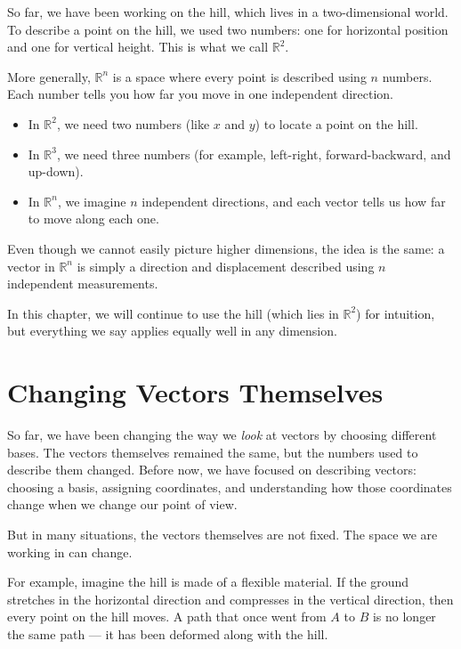 \documentclass[11pt,openany]{book}
\theoremstyle{definition}
\begin{document}
So far, we have been working on the hill, which lives in a two-dimensional world. 
To describe a point on the hill, we used two numbers: one for horizontal position 
and one for vertical height. This is what we call $\mathbb{R}^2$.

\medskip

More generally, $\mathbb{R}^n$ is a space where every point is described using $n$ 
numbers. Each number tells you how far you move in one independent direction.

\medskip

\begin{itemize}
  \item In $\mathbb{R}^2$, we need two numbers (like $x$ and $y$) to locate a point on the hill.
  \item In $\mathbb{R}^3$, we need three numbers (for example, left-right, forward-backward, and up-down).
  \item In $\mathbb{R}^n$, we imagine $n$ independent directions, and each vector tells us how far to move along each one.
\end{itemize}

\medskip

Even though we cannot easily picture higher dimensions, the idea is the same: 
a vector in $\mathbb{R}^n$ is simply a direction and displacement described using $n$ independent measurements.

\medskip

In this chapter, we will continue to use the hill (which lies in $\mathbb{R}^2$) 
for intuition, but everything we say applies equally well in any dimension.

\section{Changing Vectors Themselves}

So far, we have been changing the way we \textit{look} at vectors by choosing different bases. 
The vectors themselves remained the same, but the numbers used to describe them changed.
Before now, we have focused on describing vectors: choosing a basis, assigning coordinates, 
and understanding how those coordinates change when we change our point of view.

\medskip

But in many situations, the vectors themselves are not fixed. The space we are working in 
can change.

\medskip

For example, imagine the hill is made of a flexible material. If the ground stretches 
in the horizontal direction and compresses in the vertical direction, then every point 
on the hill moves. A path that once went from $A$ to $B$ is no longer the same path --- 
it has been deformed along with the hill.
\end{document}
